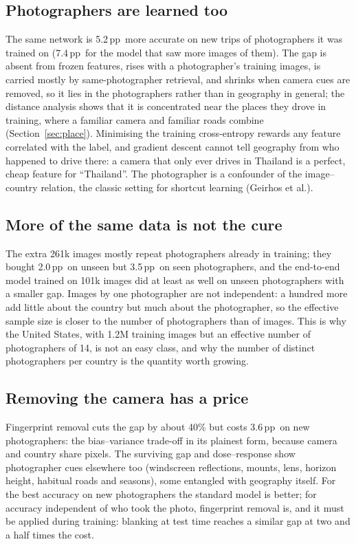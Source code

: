 \documentclass[11pt]{article}
\newcommand{\pp}{\,pp}
\begin{document}
\subsection{Photographers are learned too}
The same network is 5.2\pp\ more accurate on new trips of photographers it was trained on (7.4\pp\ for the
model that saw more images of them). The gap is absent from frozen features, rises with a photographer's
training images, is carried mostly by same-photographer retrieval, and shrinks when camera cues are
removed, so it lies in the photographers rather than in geography in general; the distance analysis shows
that it is concentrated near the places they drove in training, where a familiar camera and familiar roads
combine (Section~\ref{sec:place}). Minimising the training cross-entropy rewards any feature correlated with the label, and gradient descent cannot tell geography from who happened to drive there: a camera that only ever
drives in Thailand is a perfect, cheap feature for ``Thailand''. The photographer is a confounder of the
image--country relation, the classic setting for shortcut learning (Geirhos et al.).

\subsection{More of the same data is not the cure}
The extra 261k images mostly repeat photographers already in training; they bought 2.0\pp\ on unseen but
3.5\pp\ on seen photographers, and the end-to-end model trained on 101k images did at least as well on
unseen photographers with a smaller gap. Images by one photographer are not independent: a hundred more add little about the country but much about the photographer, so the effective sample size is closer to the number of photographers than of images. This is why the United
States, with 1.2M training images but an effective number of photographers of 14, is not an easy class, and
why the number of distinct photographers per country is the quantity worth growing.

\subsection{Removing the camera has a price}
Fingerprint removal cuts the gap by about 40\% but costs 3.6\pp\ on new photographers: the bias--variance
trade-off in its plainest form, because camera and country share pixels. The surviving gap and dose--response show photographer cues elsewhere too (windscreen reflections, mounts, lens, horizon height, habitual roads and seasons), some entangled with geography itself.
For the best accuracy on new photographers the standard model is better; for accuracy independent of who took the photo, fingerprint removal is, and it must be applied during training: blanking at test time reaches a similar gap at two and a half times the cost.
\end{document}
